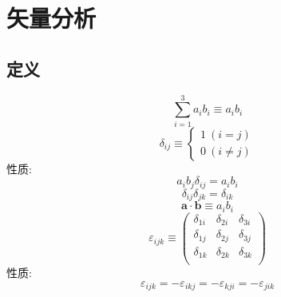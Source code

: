 



\cleardoublepage

\section{矢量分析}
\subsection{定义}
\begin{equation}
    \sum_{i=1}^3a_ib_i\equiv a_ib_i
\end{equation}
\begin{equation}
    \delta_{ij}\equiv\left\{\begin{aligned}
        1\ (i=j) \\
        0\ (i\neq j)
    \end{aligned}\right.
\end{equation}
性质:
\begin{equation}
    a_ib_j\delta_{ij}=a_ib_i
\end{equation}
\begin{equation}
    \delta_{ij}\delta_{jk}=\delta_{ik}
\end{equation}
\begin{equation}\boldsymbol{a}\cdot\boldsymbol{b}\equiv a_ib_i\end{equation}
\begin{equation}
    \varepsilon_{ijk} \equiv \begin{pmatrix}
        \delta_{1i} & \delta_{2i} & \delta_{3i} \\
        \delta_{1j} & \delta_{2j} & \delta_{3j} \\
        \delta_{1k} & \delta_{2k} & \delta_{3k} \\
    \end{pmatrix}
\end{equation}
性质:
\begin{equation}
    \varepsilon_{ijk}=-\varepsilon_{ikj}=-\varepsilon_{kji}=-\varepsilon_{jik}
\end{equation}
